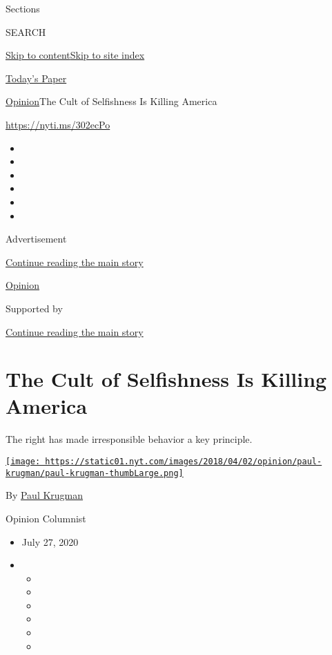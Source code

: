 Sections

SEARCH

\protect\hyperlink{site-content}{Skip to
content}\protect\hyperlink{site-index}{Skip to site index}

\href{https://myaccount.nytimes.com/auth/login?response_type=cookie\&client_id=vi}{}

\href{https://www.nytimes.com/section/todayspaper}{Today's Paper}

\href{/section/opinion}{Opinion}\textbar{}The Cult of Selfishness Is
Killing America

\url{https://nyti.ms/302ecPo}

\begin{itemize}
\item
\item
\item
\item
\item
\item
\end{itemize}

Advertisement

\protect\hyperlink{after-top}{Continue reading the main story}

\href{/section/opinion}{Opinion}

Supported by

\protect\hyperlink{after-sponsor}{Continue reading the main story}

\hypertarget{the-cult-of-selfishness-is-killing-america}{%
\section{The Cult of Selfishness Is Killing
America}\label{the-cult-of-selfishness-is-killing-america}}

The right has made irresponsible behavior a key principle.

\href{https://www.nytimes.com/by/paul-krugman}{\texttt{[image: https://static01.nyt.com/images/2018/04/02/opinion/paul-krugman/paul-krugman-thumbLarge.png]}}

By \href{https://www.nytimes.com/by/paul-krugman}{Paul Krugman}

Opinion Columnist

\begin{itemize}
\item
  July 27, 2020
\item
  \begin{itemize}
  \item
  \item
  \item
  \item
  \item
  \item
  \end{itemize}
\end{itemize}

